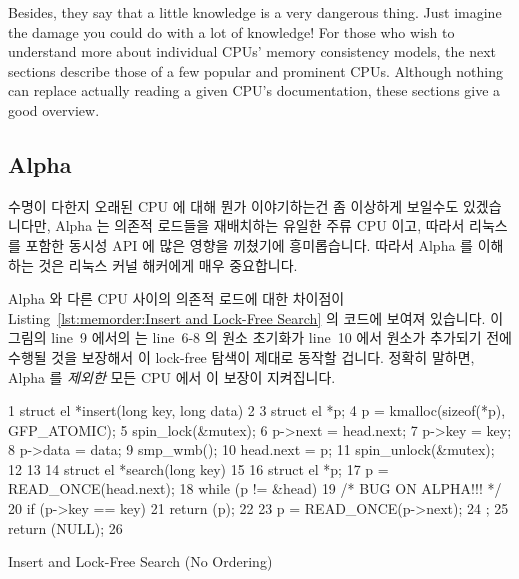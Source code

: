 Besides, they say that a little knowledge is a very dangerous thing.
Just imagine the damage you could do with a lot of knowledge!
For those who wish to understand more about individual CPUs'
memory consistency models, the next sections describe those of a few
popular and prominent CPUs.
Although nothing can replace actually reading a given CPU's documentation,
these sections give a good overview.
\fi

\subsection{Alpha}
\label{sec:memorder:Alpha}

수명이 다한지 오래된 CPU 에 대해 뭔가 이야기하는건 좀 이상하게 보일수도
있겠습니다만, Alpha 는 의존적 로드들을 재배치하는 유일한 주류 CPU 이고, 따라서
리눅스를 포함한 동시성 API 에 많은 영향을 끼쳤기에 흥미롭습니다.
따라서 Alpha 를 이해하는 것은 리눅스 커널 해커에게 매우 중요합니다.

Alpha 와 다른 CPU 사이의 의존적 로드에 대한 차이점이
Listing~\ref{lst:memorder:Insert and Lock-Free Search}
의 코드에 보여져 있습니다.
이 그림의 line~9 에서의  는 line~6-8 의 원소 초기화가 line~10
에서 원소가 추가되기 전에 수행될 것을 보장해서 이 lock-free 탐색이 제대로
동작할 겁니다.
정확히 말하면, Alpha 를 {\em 제외한} 모든 CPU 에서 이 보장이 지켜집니다.

\begin{listing}[tbp]
{ \scriptsize
\begin{verbbox}
  1 struct el *insert(long key, long data)
  2 {
  3     struct el *p;
  4     p = kmalloc(sizeof(*p), GFP_ATOMIC);
  5     spin_lock(&mutex);
  6     p->next = head.next;
  7     p->key = key;
  8     p->data = data;
  9     smp_wmb();
 10     head.next = p;
 11     spin_unlock(&mutex);
 12 }
 13
 14 struct el *search(long key)
 15 {
 16     struct el *p;
 17     p = READ_ONCE(head.next);
 18     while (p != &head) {
 19         /* BUG ON ALPHA!!! */
 20         if (p->key == key) {
 21             return (p);
 22         }
 23         p = READ_ONCE(p->next);
 24     };
 25     return (NULL);
 26 }
\end{verbbox}
}
\centering
\theverbbox
\caption{Insert and Lock-Free Search (No Ordering)}
\label{lst:memorder:Insert and Lock-Free Search (No Ordering)}
\end{listing}

